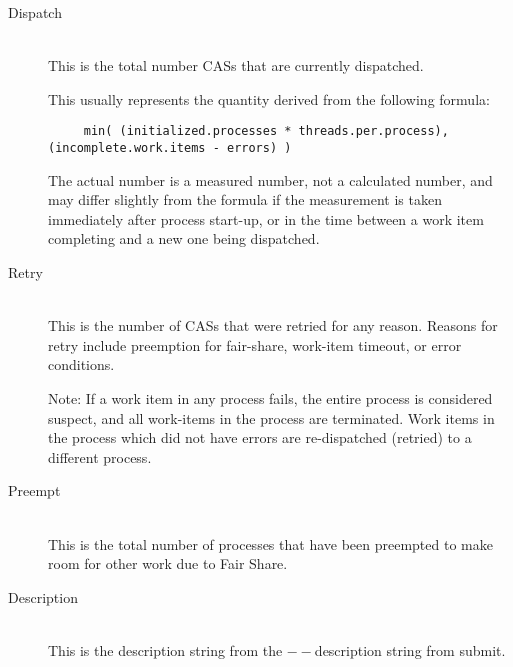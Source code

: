 \begin{description}
            \item[Dispatch] \hfill \\
              This is the total number CASs that are currently dispatched. 

              This usually represents the quantity derived from the following formula:
\begin{verbatim}              
     min( (initialized.processes * threads.per.process), (incomplete.work.items - errors) )
\end{verbatim}

              The actual number is a measured number, not a calculated number, and may differ
              slightly from the formula if the measurement is taken immediately after process
              start-up, or in the time between a work item completing and a new one being
              dispatched.
              
            \item[Retry] \hfill \\
              This is the number of CASs that were retried for any reason.  Reasons for retry
              include preemption for fair-share, work-item timeout, or error conditions.

              Note: If a work item in any process fails, the entire process is considered
              suspect, and all work-items in the process are terminated.  Work items in the
              process which did not have errors are re-dispatched (retried) to a different
              process.
              
            \item[Preempt] \hfill \\
              This is the total number of processes that have been preempted to make room for
              other work due to Fair Share.
              
            \item[Description] \hfill \\
              This is the description string from the $--$description string from submit.
            \end{description}
